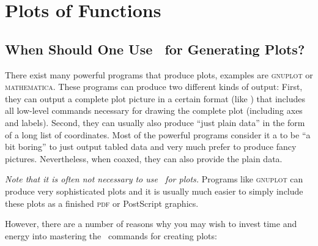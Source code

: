 %
%
%


\section{Plots of Functions}

\label{section-tikz-plots}

\subsection{When Should One Use \tikzname\ for Generating Plots? }

\label{section-why-pgname-for-plots}

There exist many powerful programs that produce plots, examples are
\textsc{gnuplot} or \textsc{mathematica}. These programs can produce
two different kinds of output: First, they can output a complete plot
picture in a certain format (like \pdf) that includes all low-level
commands necessary for drawing the complete plot (including axes and
labels). Second, they can usually also produce ``just plain data'' in
the form of a long list of coordinates. Most of the powerful programs
consider it a to be ``a bit boring'' to just output tabled data and
very much prefer to produce fancy pictures. Nevertheless, when coaxed,
they can also provide the plain data.

\emph{Note that it is often not necessary to use \tikzname\ for plots.}
Programs like \textsc{gnuplot} can produce very sophisticated plots
and it is usually much easier to simply include these plots as a
finished \textsc{pdf} or PostScript graphics.

However, there are a number of reasons why you may wish to invest time
and energy into mastering the \pgfname\ commands for creating plots:

